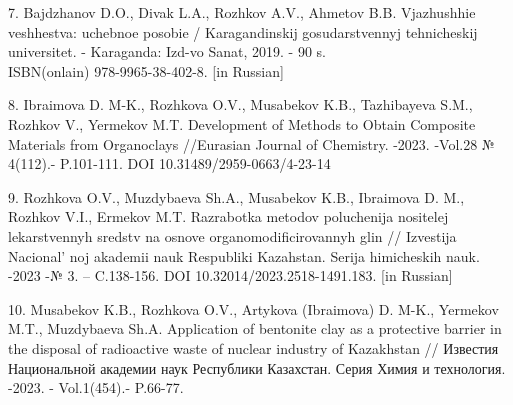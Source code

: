 \begin{references}
7. Bajdzhanov D.O., Divak L.A., Rozhkov A.V., Ahmetov B.B. Vjazhushhie
veshhestva: uchebnoe posobie / Karagandinskij gosudarstvennyj
tehnicheskij universitet. - Karaganda: Izd-vo Sanat, 2019. - 90 s.\\
ISBN(onlain) 978-9965-38-402-8. {[}in Russian{]}

8. Ibraimova D. M-K., Rozhkova O.V., Musabekov K.B., Tazhibayeva S.M.,
Rozhkov V., Yermekov M.T. Development of Methods to Obtain Composite
Materials from Organoclays //Eurasian Journal of Chemistry. -2023.
-Vol.28 № 4(112).- P.101-111. DOI 10.31489/2959-0663/4-23-14

9. Rozhkova O.V., Muzdybaeva Sh.A., Musabekov K.B., Ibraimova D. M.,
Rozhkov V.I., Ermekov M.T. Razrabotka metodov poluchenija nositelej
lekarstvennyh sredstv na osnove organomodificirovannyh glin // Izvestija
Nacional' noj akademii nauk Respubliki Kazahstan. Serija
himicheskih nauk. -2023 -№ 3. -- C.138-156. DOI
10.32014/2023.2518-1491.183. {[}in Russian{]}

10. Musabekov K.B., Rozhkova O.V., Artykova (Ibraimova) D. M-K., Yermekov
M.T., Muzdybaeva Sh.A. Application of bentonite clay as a protective
barrier in the disposal of radioactive waste of nuclear industry of
Kazakhstan // Известия Национальной академии наук Республики Казахстан.
Серия Химия и технология. -2023. - Vol.1(454).- P.66-77.
\href{https://doi.org/10.32014/2023.2518-1491.148}{}
\end{references}

